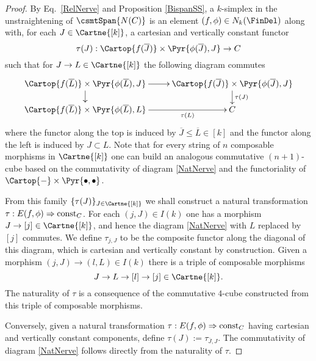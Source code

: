 \documentclass[a4paper]{article}
\numberwithin{equation}{section}
\begin{document}
\begin{proof}
 By Eq.~\ref{RelNerve} and Proposition \ref{BispanSS}, a $k$-simplex in the unstraightening of $\csmtSpan{N(C)}$ is an element $(f,\phi) \in N_k(\FinDel)$ along with, for each $J \in \Cartne{[k]}$, a cartesian and vertically constant functor
 \begin{equation*}
  \tau(J): \Cartop{f(\overline{J})} \times \Pyr{\phi(\overline{J}), J} \to C
 \end{equation*}
such that for $ J \to L \in \Cartne{[k]}$ the following diagram commutes
\begin{equation}
\label{NatNerve}
 \xymatrixrowsep{1.1pc}  \xymatrix{ \Cartop{f(\overline{L})} \times \Pyr{\phi(\overline{L}), J} \ar[r] \ar[d] & \Cartop{f(\overline{J})} \times \Pyr{\phi(\overline{J}), J} \ar[d]^-{\tau(J)} \\
 \Cartop{f(\overline{L})} \times \Pyr{\phi(\overline{L}), L} \ar[r]_-{\tau(L)} & C}
\end{equation}
where the functor along the top is induced by $\overline{J} \leq \overline{L} \in [k]$ and the functor along the left is induced by $J \subset L$. Note that for every string of $n$ composable morphisms in $\Cartne{[k]}$ one can build an analogous commutative $(n+1)$-cube based on the commutativity of diagram \ref{NatNerve} and the functoriality of $\Cartop{-}\times \Pyr{\bullet,\bullet}$. 

From this family $\{ \tau(J)\}_{J \in \Cartne{[k]}}$ we shall construct a natural transformation $\tau:E(f,\phi) \Rightarrow {\rm const}_C$. For each $(j,J) \in I(k)$ one has a morphism $J \to [j] \in \Cartne{[k]}$, and hence the diagram \ref{NatNerve} with $L$ replaced by $[j]$ commutes. We define $\tau_{j,J}$ to be the composite functor along the diagonal of this diagram, which is cartesian and vertically constant by construction. Given a morphism $(j,J) \to (l,L) \in I(k)$ there is a triple of composable morphisms 
\begin{equation*}
J \to L \to [l] \to [j] \in \Cartne{[k]}.
\end{equation*}
The naturality of $\tau$ is a consequence of the commutative $4$-cube constructed from this triple of composable morphisms.

Conversely, given a natural transformation $\tau:E(f,\phi) \Rightarrow {\rm const}_C$ having cartesian and vertically constant components, define $\tau(J) := \tau_{\overline{J}, J}$. The commutativity of diagram \ref{NatNerve} follows directly from the naturality of $\tau$. 
\end{proof}
\end{document}
